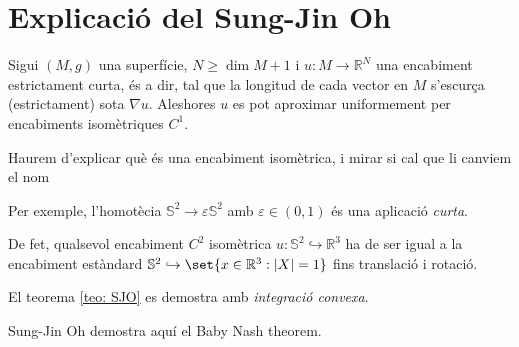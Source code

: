 



























\newpage
\section{Explicació del Sung-Jin Oh}
\begin{teo}\label{teo: SJO} Sigui $(M,g)$ una superfície, $N\ge\dim M+1$ i $u:M\to\mathbb R^N$ una encabiment estrictament curta, és a dir, tal que la longitud de cada vector en $M$ s'escurça (estrictament) sota $\nabla u$. Aleshores $u$ es pot aproximar uniformement per encabiments isomètriques $C^1$.
\end{teo}
{\color{blue} Haurem d'explicar què és una encabiment isomètrica, i mirar si cal que li canviem el nom}

Per exemple, l'homotècia $\mathbb S^2\to\varepsilon\mathbb S^2$ amb $\varepsilon\in(0,1)$ és una aplicació \textit{curta}. 
\begin{obs}
De fet, qualsevol encabiment $C^2$ isomètrica $u:\mathbb S^2\hookrightarrow\mathbb R^3$ ha de ser igual a la encabiment estàndard $\mathbb S^2 \hookrightarrow\set{ x\in\mathbb R^3 : |X| = 1 }$ fins translació i rotació. 
\end{obs}

El teorema \ref{teo: SJO} es demostra amb \textit{integració convexa}.

Sung-Jin Oh demostra aquí el Baby Nash theorem.


